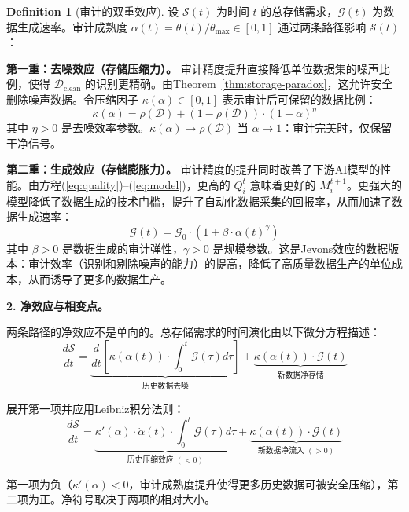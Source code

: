 \documentclass[12pt,a4paper]{ctexart}
\theoremstyle{definition}
\newtheorem{definition}{Definition}[section]
\theoremstyle{remark}
\begin{document}
\begin{definition}[审计的双重效应]
设 $\mathcal{S}(t)$ 为时间 $t$ 的总存储需求，$\mathcal{G}(t)$ 为数据生成速率。审计成熟度 $\alpha(t) = \theta(t) / \theta_{\max} \in [0, 1]$ 通过两条路径影响 $\mathcal{S}(t)$：

\textbf{第一重：去噪效应（存储压缩力）。} 审计精度提升直接降低单位数据集的噪声比例，使得 $\mathcal{D}_{\text{clean}}$ 的识别更精确。由Theorem~\ref{thm:storage-paradox}，这允许安全删除噪声数据。令压缩因子 $\kappa(\alpha) \in [0, 1]$ 表示审计后可保留的数据比例：
\begin{equation}
\kappa(\alpha) = \rho(\mathcal{D}) + (1 - \rho(\mathcal{D})) \cdot (1 - \alpha)^{\eta}
\end{equation}
其中 $\eta > 0$ 是去噪效率参数。$\kappa(\alpha) \to \rho(\mathcal{D})$ 当 $\alpha \to 1$：审计完美时，仅保留干净信号。

\textbf{第二重：生成效应（存储膨胀力）。} 审计精度的提升同时改善了下游AI模型的性能。由方程(\ref{eq:quality})–(\ref{eq:model})，更高的 $Q_i^t$ 意味着更好的 $M_i^{t+1}$。更强大的模型降低了数据生成的技术门槛，提升了自动化数据采集的回报率，从而加速了数据生成速率：
\begin{equation}
\mathcal{G}(t) = \mathcal{G}_0 \cdot \left(1 + \beta \cdot \alpha(t)^{\gamma}\right)
\end{equation}
其中 $\beta > 0$ 是数据生成的审计弹性，$\gamma > 0$ 是规模参数。这是Jevons效应的数据版本：审计效率（识别和剔除噪声的能力）的提高，降低了高质量数据生产的单位成本，从而诱导了更多的数据生产。
\end{definition}

\medskip
\noindent\textbf{2. 净效应与相变点。}

两条路径的净效应不是单向的。总存储需求的时间演化由以下微分方程描述：
\begin{equation}
\frac{d\mathcal{S}}{dt} = \underbrace{\frac{d}{dt}\left[\kappa(\alpha(t)) \cdot \int_0^t \mathcal{G}(\tau) d\tau\right]}_{\text{历史数据去噪}} + \underbrace{\kappa(\alpha(t)) \cdot \mathcal{G}(t)}_{\text{新数据净存储}}
\end{equation}

展开第一项并应用Leibniz积分法则：
\begin{equation}
\frac{d\mathcal{S}}{dt} = \underbrace{\kappa'(\alpha) \cdot \dot{\alpha}(t) \cdot \int_0^t \mathcal{G}(\tau) d\tau}_{\text{历史压缩效应 }(<0)} + \underbrace{\kappa(\alpha(t)) \cdot \mathcal{G}(t)}_{\text{新数据净流入 }(>0)}
\end{equation}

第一项为负（$\kappa'(\alpha) < 0$，审计成熟度提升使得更多历史数据可被安全压缩），第二项为正。净符号取决于两项的相对大小。
\end{document}
